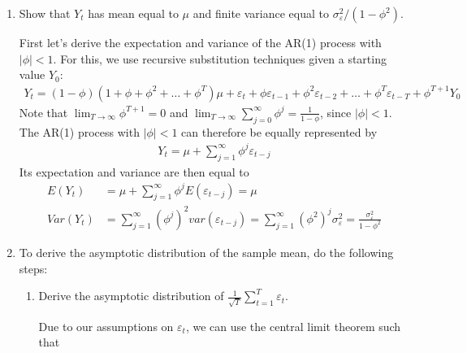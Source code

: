 \documentclass[a4paper]{scrartcl}
\begin{document}
\begin{enumerate}
\begin{solution}
              \end{solution}
        \item Show that $Y_t$ has mean equal to $\mu $ and finite variance equal to $\sigma_\varepsilon^2/(1-\phi^2)$.
              \begin{solution}
                  First let's derive the expectation and variance of the AR(1) process with $|\phi|<1$. For this, we use recursive substitution techniques given a starting value $Y_0$:
                  \begin{align*}
                      Y_t = (1-\phi)(1+\phi+\phi^2+\dots+\phi^T)\mu + \varepsilon_t + \phi \varepsilon_{t-1} + \phi^2 \varepsilon_{t-2} + \dots + \phi^T \varepsilon_{t-T} + \phi^{T+1} Y_0
                  \end{align*}
                  Note that $\lim_{T\rightarrow \infty} \phi^{T+1} = 0$ and $\lim_{T\rightarrow \infty} \sum_{j=0}^\infty \phi^j = \frac{1}{1-\phi}$, since $|\phi|<1$. The AR(1) process with $|\phi|<1$ can therefore be equally represented by
                  \begin{align*}
                      Y_t = \mu + \sum_{j=1}^\infty \phi^j \varepsilon_{t-j}
                  \end{align*}
                  Its expectation and variance are then equal to
                  \begin{align*}
                      E(Y_t)   & = \mu + \sum_{j=1}^\infty \phi^j E(\varepsilon_{t-j}) = \mu                                                                                       \\
                      Var(Y_t) & = \sum_{j=1}^\infty (\phi^j)^2 var(\varepsilon_{t-j}) = \sum_{j=1}^\infty (\phi^2)^j \sigma_\varepsilon^2 = \frac{\sigma_\varepsilon^2}{1-\phi^2}
                  \end{align*}
              \end{solution}
        \item To derive the asymptotic distribution of the sample mean, do the following steps:
              \begin{enumerate}
                  \item Derive the asymptotic distribution of $\frac{1}{\sqrt{T} } \sum_{t=1}^T \varepsilon_t$.
                        \begin{solution}
                            Due to our assumptions on $\varepsilon_t$, we can use the central limit theorem such that
                            \begin{equation*}

\end{equation*}
\end{solution}
\end{enumerate}
\end{enumerate}
\end{document}

